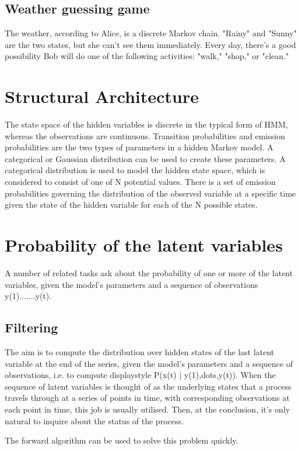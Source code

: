 \documentclass[10pt,a4paper,twoside]{article}
\begin{document}
\subsection{ Weather guessing game}
The weather, according to Alice, is a discrete Markov chain. "Rainy" and "Sunny" are the two states, but she can't see them immediately. Every day, there's a good possibility Bob will do one of the following activities: "walk," "shop," or "clean."

\section{Structural Architecture  }
The state space of the hidden variables is discrete in the typical form of HMM, whereas the observations are continuous. Transition probabilities and emission probabilities are the two types of parameters in a hidden Markov model. A categorical or Gaussian distribution can be used to create these parameters. A categorical distribution is used to model the hidden state space, which is considered to consist of one of N potential values. There is a set of emission probabilities governing the distribution of the observed variable at a specific time given the state of the hidden variable for each of the N possible states.


\section{  Probability of the latent variables     }

A number of related tasks ask about the probability of one or more of the latent variables, given the model's parameters and a sequence of observations y(1).......y(t).
 \subsection{Filtering}
The aim is to compute the distribution over hidden states of the last latent variable at the end of the series, given the model's parameters and a sequence of observations, i.e. to compute displaystyle P(x(t) | y(1),dots,y(t)). When the sequence of latent variables is thought of as the underlying states that a process travels through at a series of points in time, with corresponding observations at each point in time, this job is usually utilised. Then, at the conclusion, it's only natural to inquire about the status of the process.

The forward algorithm can be used to solve this problem quickly.
\end{document}
